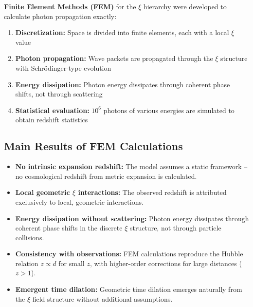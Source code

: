 \textbf{Finite Element Methods (FEM)} for the $\xi$ hierarchy were developed 
to calculate photon propagation exactly:

\begin{enumerate}
\item \textbf{Discretization:} 
      Space is divided into finite elements, each with a local $\xi$ value

\item \textbf{Photon propagation:} 
      Wave packets are propagated through the $\xi$ structure with 
      Schr\"odinger-type evolution

\item \textbf{Energy dissipation:} 
      Photon energy dissipates through coherent phase shifts, not through 
      scattering

\item \textbf{Statistical evaluation:} 
      $10^6$ photons of various energies are simulated to obtain redshift 
      statistics
\end{enumerate}

\subsection{Main Results of FEM Calculations}

\begin{itemize}
\item \textbf{No intrinsic expansion redshift:} 
      The model assumes a static framework -- no cosmological redshift from 
      metric expansion is calculated.

\item \textbf{Local geometric $\xi$ interactions:} 
      The observed redshift is attributed exclusively to local, geometric 
      interactions.

\item \textbf{Energy dissipation without scattering:} 
      Photon energy dissipates through coherent phase shifts in the discrete 
      $\xi$ structure, not through particle collisions.

\item \textbf{Consistency with observations:} 
      FEM calculations reproduce the Hubble relation $z \propto d$ for small 
      $z$, with higher-order corrections for large distances ($z > 1$).

\item \textbf{Emergent time dilation:} 
      Geometric time dilation emerges naturally from the $\xi$ field structure 
      without additional assumptions.
\end{itemize}


